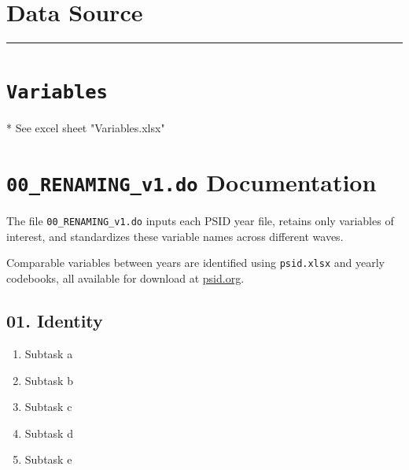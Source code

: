 \documentclass[12pt]{article}
\begin{document}
\section*{Data Source}


\bigskip\noindent\rule{\textwidth}{0.4pt}\bigskip

\section*{\texttt{Variables}}
* See excel sheet "Variables.xlsx"

\newpage

\section*{\texttt{00\_RENAMING\_v1.do} Documentation}

The file \texttt{00\_RENAMING\_v1.do} inputs each PSID year file, retains only variables of interest, and standardizes these variable names across different waves.

Comparable variables between years are identified using \texttt{psid.xlsx} and yearly codebooks, all available for download at \href{https://psidonline.isr.umich.edu/}{psid.org}.

\subsection*{01. Identity}
\begin{enumerate}[label=\alph*.]
    \item Subtask a
    \item Subtask b
    \item Subtask c
    \item Subtask d
    \item Subtask e
\end{enumerate}
\end{document}
